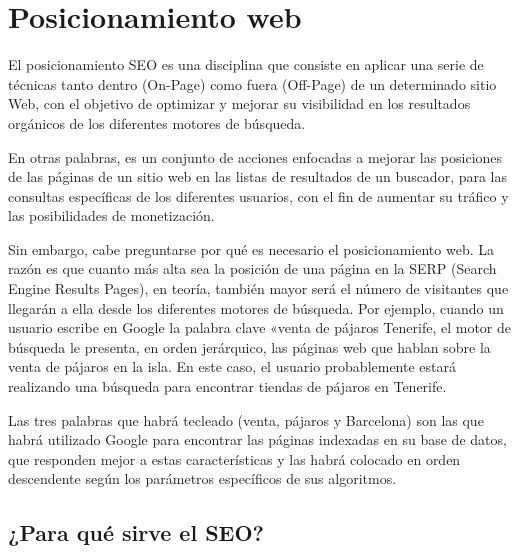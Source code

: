 \chapter{Posicionamiento web}

El posicionamiento SEO es una disciplina que consiste en aplicar una serie de técnicas tanto dentro (On-Page) como fuera (Off-Page) de un determinado sitio Web, con el objetivo de optimizar y mejorar su visibilidad en los resultados orgánicos de los diferentes motores de búsqueda.

En otras palabras, es un conjunto de acciones enfocadas a mejorar las posiciones de las páginas de un sitio web en las listas de resultados de un buscador, para las consultas específicas de los diferentes usuarios, con el fin de aumentar su tráfico y las posibilidades de monetización.

Sin embargo, cabe preguntarse por qué es necesario el posicionamiento web. La razón es que cuanto más alta sea la posición de una página en la SERP (Search Engine Results Pages), en teoría, también mayor será el número de visitantes que llegarán a ella desde los diferentes motores de búsqueda. Por ejemplo, cuando un usuario escribe en Google la palabra clave «venta de pájaros Tenerife, el motor de búsqueda le presenta, en orden jerárquico, las páginas web que hablan sobre la venta de pájaros en la isla. En este caso, el usuario probablemente estará realizando una búsqueda para encontrar tiendas de pájaros en Tenerife.

Las tres palabras que habrá tecleado (venta, pájaros y Barcelona) son las que habrá utilizado Google para encontrar las páginas indexadas en su base de datos, que responden mejor a estas características y las habrá colocado en orden descendente según los parámetros específicos de sus algoritmos.

\section{¿Para qué sirve el SEO?}

